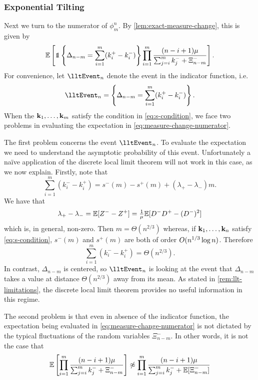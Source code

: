 \subsubsection{Exponential Tilting}

Next we turn to the numerator of $\phi^n_m$. By \cref{lem:exact-measure-change}, this is given by
\begin{equation}
    \label{eq:measure-change-numerator}
    \E\left[ 
        \one \left\{ \Delta_{n-m} = \sum_{i=1}^m (k_i^+ - k_i^-) \right\}
        \prod_{i=1}^m \frac{(n - i + 1) \mu}{\sum_{j=i}^m k_j^- + \Xi_{n-m}^-}
    \right].
\end{equation}
For convenience, let $\lltEvent_n$ denote the event in the indicator function, i.e.
\begin{equation*}
    \lltEvent_n = \left\{ \Delta_{n-m} = \sum_{i=1}^m (k_i^+ - k_i^-) \right\}.
\end{equation*}
When the ${\mathbf k}_1, \ldots, {\mathbf k}_m$ satisfy the condition in \cref{eq:s-condition}, we face two problems in evaluating the expectation in \cref{eq:measure-change-numerator}.


The first problem concerns the event $\lltEvent_n$. To evaluate the expectation we need to understand the asymptotic probability of this event. Unfortunately a naïve application of the discrete local limit theorem will not work in this case, as we now explain. Firstly, note that
\begin{equation*}
    \sum_{i=1}^m (k_i^- - k_i^+) = s^-(m) - s^+(m) + (\lambda_+ - \lambda_-) m.
\end{equation*}
We have that
\begin{equation*}
    \lambda_+ - \lambda_- = {\mathbb E}[Z^- - Z^+] = \tfrac{1}{\mu} {\mathbb E}[D^-D^+ - (D^-)^2]
\end{equation*}
which is, in general, non-zero. Then $m = \Theta(n^{2/3})$ whereas, if ${\mathbf k}_1, \ldots, {\mathbf k}_n$ satisfy \cref{eq:s-condition}, $s^{-}(m)$ and $s^+(m)$ are both of order $O(n^{1/3} \log n)$. Therefore
\begin{equation*}
    \sum_{i=1}^m (k_i^- - k_i^+) = \Theta(n^{2/3}).
\end{equation*}
In contrast, $\Delta_{n-m}$ is centered, so $\lltEvent_n$ is looking at the event that $\Delta_{n-m}$ takes a value at distance $\Theta(n^{2/3})$ away from its mean. As stated in \cref{rem:llt-limitations}, the discrete local limit theorem provides no useful information in this regime. 

The second problem is that even in absence of the indicator function, the expectation being evaluated in \cref{eq:measure-change-numerator} is not dictated by the typical fluctuations of the random variables $\Xi^-_{n-m}$. In other words, it is not the case that
\begin{equation}
    {\mathbb E}\left[ 
        \prod_{i=1}^m \frac{(n - i + 1) \mu}{\sum_{j=i}^m k_j^- + \Xi_{n-m}^-}
    \right]
    \not \approx
    \prod_{i=1}^m \frac{(n - i + 1) \mu}{\sum_{j=i}^m k_j^- + {\mathbb E}[\Xi_{n-m}^-]}
\end{equation}

